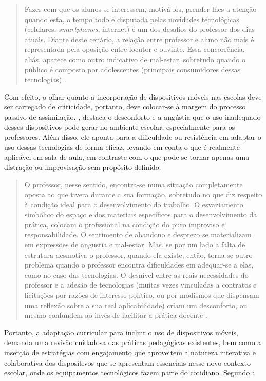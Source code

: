 \documentclass[portuguese]{textolivre}
\begin{document}
\begin{quote}
    Fazer com que os alunos se interessem, motivá-los, prender-lhes a atenção quando esta, o tempo todo é disputada pelas novidades tecnológicas (celulares, \textit{smartphones}, internet) é um dos desafios do professor dos dias atuais. Diante deste cenário, a relação entre professor e aluno não mais é representada pela oposição entre locutor e ouvinte. Essa concorrência, aliás, aparece como outro indicativo de mal-estar, sobretudo quando o público é composto por adolescentes (principais consumidores dessas tecnologias) \cite[p. 129]{quiroga_o_2013}.
\end{quote}

Com efeito, o olhar quanto a incorporação de dispositivos móveis nas escolas deve ser carregado de criticidade, portanto, deve colocar-se à margem do processo passivo de assimilação. \textcite{quiroga_o_2013}, destaca o desconforto e a angústia que o uso inadequado desses dispositivos pode gerar no ambiente escolar, especialmente para os professores. Além disso, ele aponta para a dificuldade ou resistência em adaptar o uso dessas tecnologias de forma eficaz, levando em conta o que é realmente aplicável em sala de aula, em contraste com o que pode se tornar apenas uma distração ou improvisação sem propósito definido.

\begin{quote}
    O professor, nesse sentido, encontra-se numa situação completamente oposta ao que tivera durante a sua formação, sobretudo no que diz respeito à condição ideal para o desenvolvimento do trabalho. O esvaziamento simbólico do espaço e dos materiais específicos para o desenvolvimento da prática, colocam o profissional na condição do puro improviso e responsabilidade. O sentimento de abandono e desprezo se materializam em expressões de angustia e mal-estar. Mas, se por um lado a falta de estrutura desmotiva o professor, quando ela existe, então, torna-se outro problema quando o professor encontra dificuldades em adequar-se a elas, como no caso das tecnologias. O desnível entre as reais necessidades do professor e a adesão de tecnologias (muitas vezes vinculadas a contratos e licitações por razões de interesse político, ou por modismos que dispensam uma reflexão sobre a sua real aplicabilidade) criam um desconforto, ou mesmo confundem ao invés de facilitar a prática docente \cite[p. 134-135]{quiroga_o_2013}.
\end{quote}

Portanto, a adaptação curricular para incluir o uso de dispositivos móveis, demanda uma revisão cuidadosa das práticas pedagógicas existentes, bem como a inserção de estratégias com engajamento que aproveitem a natureza interativa e colaborativa dos dispositivos que se apresentam essenciais nesse novo contexto escolar, onde os equipamentos tecnológicos fazem parte do cotidiano. Segundo \textcite{ferreira_educacao_2017}:
\end{document}
